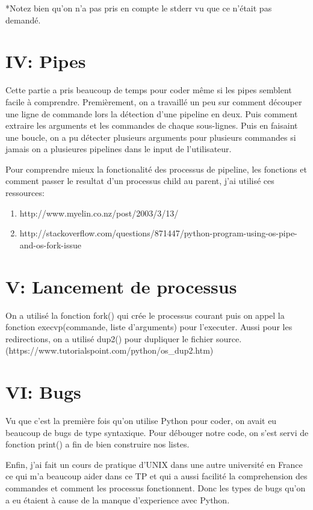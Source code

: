 \documentclass{article}
\begin{document}
	*Notez bien qu'on n'a pas pris en compte le stderr vu que ce n'était pas demandé.

\section*{IV: Pipes}
	Cette partie a pris beaucoup de temps pour coder même si les pipes semblent facile à comprendre. Premièrement, on a travaillé un peu sur comment découper une ligne de commande lors la détection d'une pipeline en deux. Puis comment extraire les arguments et les commandes de chaque sous-lignes.
	Puis en faisaint une boucle, on a pu détecter plusieurs arguments pour plusieurs commandes si jamais on a plusieures pipelines dans le input de l'utilisateur.

	Pour comprendre mieux la fonctionalité des processus de pipeline, les fonctions et comment passer le resultat d'un processus child au parent, j'ai utilisé ces ressources:
\begin{enumerate}
	\item {http://www.myelin.co.nz/post/2003/3/13/}
	\item {http://stackoverflow.com/questions/871447/python-program-using-os-pipe-and-os-fork-issue}
\end{enumerate}

\section*{V: Lancement de processus}
	On a utilisé la fonction fork() qui crée le processus courant puis on appel la fonction execvp(commande, liste d'arguments) pour l'executer.
	Aussi pour les redirections, on a utilisé dup2() pour dupliquer le fichier source.\newline
	(https://www.tutorialspoint.com/python/os\_dup2.htm)

\section*{VI: Bugs}
	Vu que c'est la première fois qu'on utilise Python pour coder, on avait eu beaucoup de bugs de type syntaxique. 
	Pour débouger notre code, on s'est servi de fonction print() a fin de bien construire nos listes.\newline

Enfin, j'ai fait un cours de pratique d'UNIX dans une autre université en France ce qui m'a beaucoup aider dans ce TP et qui a aussi facilité la comprehension des commandes et comment les processus fonctionnent. Donc les types de bugs qu'on a eu étaient à cause de la manque d'experience avec Python.
\end{document}
